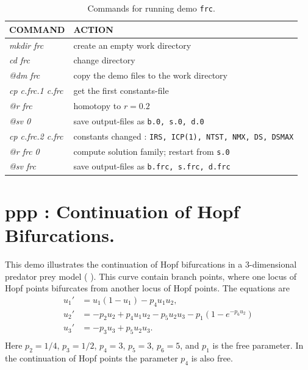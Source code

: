 \documentclass[12pt]{report}
\begin{document}
\begin{table}[htbp]
\begin{center}
\begin{tabular}{| l | l |}
\hline
  COMMAND  & ACTION \\
\hline
  {\it mkdir frc} & create an empty work directory \\ 
  {\it cd frc} & change directory \\
  {\it @dm frc} & copy the demo files to the work directory \\
\hline
  {\it cp c.frc.1 c.frc} & get the first constants-file \\ 
  {\it @r frc} & homotopy to $r=0.2$ \\ 
  {\it @sv 0} & save output-files as {\tt b.0, s.0, d.0} \\ 
\hline
  {\it cp c.frc.2 c.frc} & constants changed : {\tt IRS, ICP(1), NTST, NMX, DS, DSMAX} \\ 
  {\it @r frc 0} & compute solution family; restart from {\tt s.0} \\ 
  {\it @sv frc} & save output-files as {\tt b.frc, s.frc, d.frc} \\ 
\hline
\end{tabular}
\caption{Commands for running demo {\tt frc}.}
\label{tbl:demo_frc}
\end{center}
\end{table}

\newpage
\section{ ppp :  Continuation of Hopf Bifurcations.} \label{sec:Demos_ppp}
This demo illustrates the continuation of Hopf bifurcations in a 3-dimensional 
predator prey model ( \citeyear{Do:84}).
This curve contain branch points, where one locus of Hopf points
bifurcates from another locus of Hopf points.
The equations are
\begin{equation} \begin{array}{cl}
  u_1 ' &= u_1(1-u_1) - p_4 u_1 u_2  ,  \\
  u_2 ' &= -p_2 u_2 + p_4 u_1 u_2 - p_5 u_2 u_3
  -p_1(1-e^{-p_6 u_2}) \\
  u_3 ' &= -p_3 u_3  + p_5 u_2 u_3  .  \\  
\end{array} \end{equation}
Here $p_2=1/4$,  $p_3=1/2$,  $p_4=3$,  $p_5=3$,  $p_6=5$,
and $p_1$ is the free parameter.
In the continuation of Hopf points the parameter $p_4$
is also free.
\end{document}
